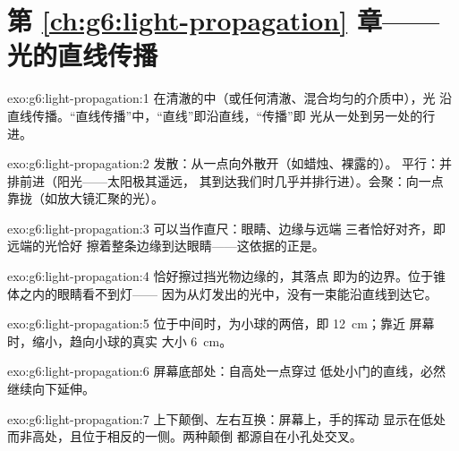 \section*{第 \ref{ch:g6:light-propagation} 章——光的直线传播}

\begin{solution}{exo:g6:light-propagation:1}
在清澈的中（或任何清澈、混合均匀的介质中），光
沿直线传播。“直线传播”中，“直线”即沿直线，“传播”即
光从一处到另一处的行进。
\end{solution}

\begin{solution}{exo:g6:light-propagation:2}
发散：从一点向外散开（如蜡烛、裸露的）。
平行：并排前进（阳光——太阳极其遥远，
其到达我们时几乎并排行进）。会聚：向一点
靠拢（如放大镜汇聚的光）。
\end{solution}

\begin{solution}{exo:g6:light-propagation:3}
可以当作直尺：眼睛、边缘与远端
三者恰好对齐，即远端的光恰好
擦着整条边缘到达眼睛——这依据的正是。
\end{solution}

\begin{solution}{exo:g6:light-propagation:4}
恰好擦过挡光物边缘的，其落点
即为的边界。位于锥体之内的眼睛看不到灯——
因为从灯发出的光中，没有一束能沿直线到达它。
\end{solution}

\begin{solution}{exo:g6:light-propagation:5}
位于中间时，为小球的两倍，即 \qty{12}{cm}；靠近
屏幕时，缩小，趋向小球的真实
大小 \qty{6}{cm}。
\end{solution}

\begin{solution}{exo:g6:light-propagation:6}
屏幕底部处：自高处一点穿过
低处小门的直线，必然继续向下延伸。
\end{solution}

\begin{solution}{exo:g6:light-propagation:7}
上下颠倒、左右互换：屏幕上，手的挥动
显示在低处而非高处，且位于相反的一侧。两种颠倒
都源自在小孔处交叉。
\end{solution}

